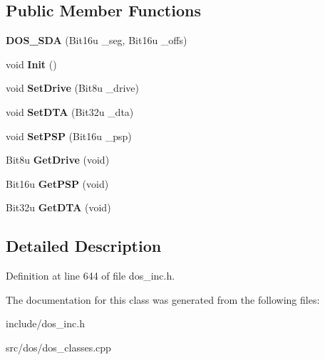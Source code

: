 \subsection*{Public Member Functions}
\begin{DoxyCompactItemize}
\item 
\hypertarget{classDOS__SDA_a6d3cdb7092bcf54e478ccf3f47ba5d5f}{{\bfseries D\-O\-S\-\_\-\-S\-D\-A} (Bit16u \-\_\-seg, Bit16u \-\_\-offs)}\label{classDOS__SDA_a6d3cdb7092bcf54e478ccf3f47ba5d5f}

\item 
\hypertarget{classDOS__SDA_ac7714f909bc845b995adc9d83a336dc7}{void {\bfseries Init} ()}\label{classDOS__SDA_ac7714f909bc845b995adc9d83a336dc7}

\item 
\hypertarget{classDOS__SDA_a26e7bcf4f9d9624cb400868ba2c92042}{void {\bfseries Set\-Drive} (Bit8u \-\_\-drive)}\label{classDOS__SDA_a26e7bcf4f9d9624cb400868ba2c92042}

\item 
\hypertarget{classDOS__SDA_a97cc9bf22c2fd0b3dfcdf9e7ed941b90}{void {\bfseries Set\-D\-T\-A} (Bit32u \-\_\-dta)}\label{classDOS__SDA_a97cc9bf22c2fd0b3dfcdf9e7ed941b90}

\item 
\hypertarget{classDOS__SDA_a01a00b99627b18c1b53112911554fb40}{void {\bfseries Set\-P\-S\-P} (Bit16u \-\_\-psp)}\label{classDOS__SDA_a01a00b99627b18c1b53112911554fb40}

\item 
\hypertarget{classDOS__SDA_a6191cfbb11aa6071c6900e3a42d3d4e8}{Bit8u {\bfseries Get\-Drive} (void)}\label{classDOS__SDA_a6191cfbb11aa6071c6900e3a42d3d4e8}

\item 
\hypertarget{classDOS__SDA_a7a777fd33ac1dcf09aeaa1e94e53eec5}{Bit16u {\bfseries Get\-P\-S\-P} (void)}\label{classDOS__SDA_a7a777fd33ac1dcf09aeaa1e94e53eec5}

\item 
\hypertarget{classDOS__SDA_a4a0b598523ac18da40e069ff37f43fe4}{Bit32u {\bfseries Get\-D\-T\-A} (void)}\label{classDOS__SDA_a4a0b598523ac18da40e069ff37f43fe4}

\end{DoxyCompactItemize}


\subsection{Detailed Description}


Definition at line 644 of file dos\-\_\-inc.\-h.



The documentation for this class was generated from the following files\-:\begin{DoxyCompactItemize}
\item 
include/dos\-\_\-inc.\-h\item 
src/dos/dos\-\_\-classes.\-cpp\end{DoxyCompactItemize}
